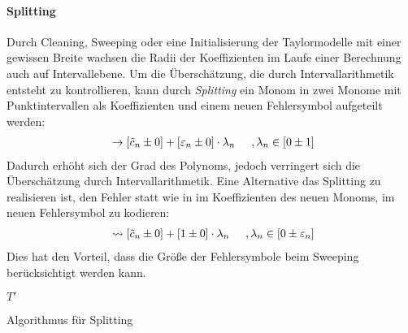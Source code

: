     

\paragraph{Splitting}
Durch Cleaning, Sweeping oder eine Initialisierung der Taylormodelle mit einer gewissen Breite wachsen die Radii der Koeffizienten im Laufe einer Berechnung auch auf Intervallebene. Um die Überschätzung, die durch Intervallarithmetik entsteht zu kontrollieren, kann durch \textit{Splitting} ein Monom in zwei Monome mit Punktintervallen als Koeffizienten und einem neuen Fehlersymbol aufgeteilt werden:
\begin{align*}
[\tilde{c}_n \pm \varepsilon_n]\ \rightarrow [\tilde{c}_n \pm 0] + [\varepsilon_n \pm 0]\cdot  \lambda_n \hspace{0.5cm}, \lambda_n \in [0 \pm 1]
\end{align*}
Dadurch erhöht sich der Grad des Polynoms, jedoch verringert sich die Überschätzung durch Intervallarithmetik. Eine Alternative das Splitting zu realisieren ist, den Fehler statt wie in \cite{DBLP:conf/macis/BrausseKM15} im Koeffizienten des neuen Monoms, im neuen Fehlersymbol zu kodieren:
\begin{align*}
 [\tilde{c}_n \pm \varepsilon_n]\ \rightsquigarrow [\tilde{c}_n \pm 0] + [1 \pm 0]\cdot  \lambda_n \hspace{0.5cm}, \lambda_n \in [0 \pm \varepsilon_n]
\end{align*}
Dies hat den Vorteil, dass die Größe der Fehlersymbole beim Sweeping berücksichtigt werden kann.

\begin{algorithm}[H]
\label{algo:split}
\SetAlgoLined
{}
\DontPrintSemicolon
{}

\Return $T'$ 
 \caption{Algorithmus für Splitting}
\end{algorithm}





